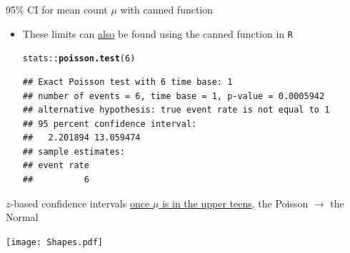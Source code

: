 \documentclass[10pt,handout]{beamer}\usepackage[]{graphicx}\usepackage[]{color}
\makeatletter
\newcommand{\hlnum}[1]{\textcolor[rgb]{0.686,0.059,0.569}{#1}}%
\newcommand{\hlopt}[1]{\textcolor[rgb]{0,0,0}{#1}}%
\newcommand{\hlstd}[1]{\textcolor[rgb]{0.345,0.345,0.345}{#1}}%
\newcommand{\hlkwd}[1]{\textcolor[rgb]{0.737,0.353,0.396}{\textbf{#1}}}%
\newenvironment{kframe}{%
 \def\at@end@of@kframe{}%
 \ifinner\ifhmode%
  \def\at@end@of@kframe{\end{minipage}}%
  \begin{minipage}{\columnwidth}%
 \fi\fi%
 \def\FrameCommand##1{\hskip\@totalleftmargin \hskip-\fboxsep
 \colorbox{shadecolor}{##1}\hskip-\fboxsep
     \hskip-\linewidth \hskip-\@totalleftmargin \hskip\columnwidth}%
 \MakeFramed {\advance\hsize-\width
   \@totalleftmargin\z@ \linewidth\hsize
   \@setminipage}}%
 {\par\unskip\endMakeFramed%
 \at@end@of@kframe}
\newenvironment{knitrout}{}{} %
\makeatother
\begin{document}
\begin{frame}[fragile]{95\% CI for mean count $\mu$ with canned function}
	\begin{itemize}
		\setlength\itemsep{1em}
		\item These limits can \underline{also} be found using  the canned function in \texttt{R} 
		
\begin{knitrout}\tiny
{}\color{fgcolor}\begin{kframe}
\begin{alltt}
\hlstd{stats}\hlopt{::}\hlkwd{poisson.test}\hlstd{(}\hlnum{6}\hlstd{)}
\end{alltt}
\begin{verbatim}
## Exact Poisson test with 6 time base: 1 
## number of events = 6, time base = 1, p-value = 0.0005942
## alternative hypothesis: true event rate is not equal to 1 
## 95 percent confidence interval:
##   2.201894 13.059474 
## sample estimates:
## event rate 
##          6
\end{verbatim}
\end{kframe}
\end{knitrout}
		
	\end{itemize}
\end{frame}



\begin{frame}{$z$-based confidence intervals}
	\scriptsize
	\underline{once $\mu$ is in the upper teens}, the Poisson $\to$ the Normal
	
	\centering
	\texttt{[image: Shapes.pdf]}
	
\end{frame}
\end{document}
